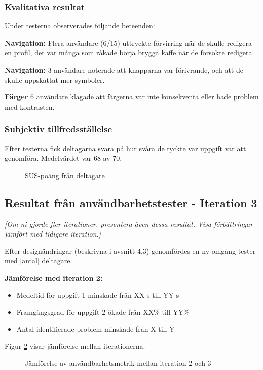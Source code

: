 \subsubsection{Kvalitativa resultat}

Under testerna observerades följande beteenden:

\textbf{Navigation:} Flera användare (6/15) uttryckte förvirring när de skulle redigera en profil, det var många som råkade börja brygga kaffe när de försökte redigera.

\textbf{Navigation:} 3 användare noterade att knapparna var förivrande, och att de skulle uppskattat mer symboler. 

\textbf{Färger} 6 användare klagade att färgerna var inte konsekventa eller hade problem med kontrasten. 


\subsubsection{Subjektiv tillfredsställelse}

Efter testerna fick deltagarna svara på hur svåra de tyckte var uppgift var att genomföra. Medelvärdet var 68 av 70.

\begin{figure}[ht]
    \centering
    \caption{SUS-poäng från deltagare}
    \label{fig:sus}
\end{figure}


\subsection{Resultat från användbarhetstester - Iteration 3}

\textit{[Om ni gjorde fler iterationer, presentera även dessa resultat. Visa förbättringar jämfört med tidigare iteration.]}

Efter designändringar (beskrivna i avsnitt 4.3) genomfördes en ny omgång tester med [antal] deltagare.

\textbf{Jämförelse med iteration 2:}

\begin{itemize}
    \item Medeltid för uppgift 1 minskade från XX s till YY s
    \item Framgångsgrad för uppgift 2 ökade från XX\% till YY\%
    \item Antal identifierade problem minskade från X till Y
\end{itemize}

Figur \ref{fig:comparison} visar jämförelse mellan iterationerna.

\begin{figure}[ht]
    \centering
    \caption{Jämförelse av användbarhetsmetrik mellan iteration 2 och 3}
    \label{fig:comparison}
\end{figure}

